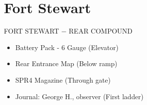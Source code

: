 \chapter{Fort Stewart}

\begin{subregion}{FORT STEWART $\boldsymbol{-}$ REAR COMPOUND}
    \begin{itemize}
        \item Battery Pack - 6 Gauge (Elevator)
        \item Rear Entrance Map (Below ramp)
        \item SPR4 Magazine (Through gate)
        \item Journal: George H., observer (First ladder)
    \end{itemize}
\end{subregion}
